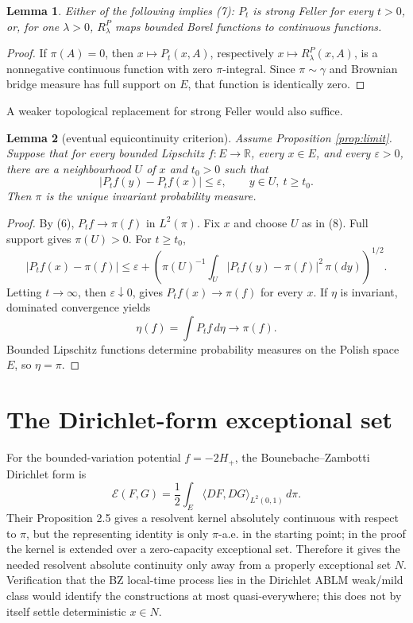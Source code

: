 \documentclass[12pt]{article}
\newtheorem{lemma}{Lemma}
\newcommand{\R}{\mathbb R}
\newcommand{\1}{\mathbf 1}
\newcommand{\cE}{\mathcal E}
\begin{document}
\begin{lemma}\label{lem:sf}
Either of the following implies (7): \(P_t\) is strong Feller for every
\(t>0\), or, for one \(\lambda>0\), \(R_\lambda^P\) maps bounded Borel
functions to continuous functions.
\end{lemma}

\begin{proof}
If \(\pi(A)=0\), then \(x\mapsto P_t(x,A)\), respectively
\(x\mapsto R_\lambda^P(x,A)\), is a nonnegative continuous function with
zero \(\pi\)-integral.  Since \(\pi\sim\gamma\) and Brownian bridge
measure has full support on \(E\), that function is identically zero.
\end{proof}

A weaker topological replacement for strong Feller would also suffice.

\begin{lemma}[eventual equicontinuity criterion]\label{lem:eprop}
Assume Proposition \ref{prop:limit}.  Suppose that for every bounded
Lipschitz \(f:E\to\R\), every \(x\in E\), and every \(\varepsilon>0\),
there are a neighbourhood \(U\) of \(x\) and \(t_0>0\) such that
\[
        |P_t f(y)-P_t f(x)|\le\varepsilon,
        \qquad y\in U,\ t\ge t_0 .                  \tag{8}
\]
Then \(\pi\) is the unique invariant probability measure.
\end{lemma}

\begin{proof}
By (6), \(P_t f\to \pi(f)\) in \(L^2(\pi)\).  Fix \(x\) and choose \(U\)
as in (8).  Full support gives \(\pi(U)>0\).  For \(t\ge t_0\),
\[
 |P_t f(x)-\pi(f)|
 \le \varepsilon
 +\left(\pi(U)^{-1}\int_U |P_t f(y)-\pi(f)|^2\,\pi(dy)\right)^{1/2}.
\]
Letting \(t\to\infty\), then \(\varepsilon\downarrow0\), gives
\(P_t f(x)\to\pi(f)\) for every \(x\).  If \(\eta\) is invariant, dominated
convergence yields
\[
     \eta(f)=\int P_t f\,d\eta \longrightarrow \pi(f).
\]
Bounded Lipschitz functions determine probability measures on the Polish
space \(E\), so \(\eta=\pi\).
\end{proof}

\section*{The Dirichlet-form exceptional set}

For the bounded-variation potential \(f=-2H_+\), the Bounebache--Zambotti
Dirichlet form is
\[
        \cE(F,G)=\frac12\int_E\langle DF,DG\rangle_{L^2(0,1)}\,d\pi .
\]
Their Proposition 2.5 gives a resolvent kernel absolutely continuous with
respect to \(\pi\), but the representing identity is only \(\pi\)-a.e. in
the starting point; in the proof the kernel is extended over a
zero-capacity exceptional set.  Therefore it gives the needed resolvent
absolute continuity only away from a properly exceptional set \(N\).
Verification that the BZ local-time process lies in the Dirichlet ABLM
weak/mild class would identify the constructions at most quasi-everywhere;
this does not by itself settle deterministic \(x\in N\).
\end{document}
